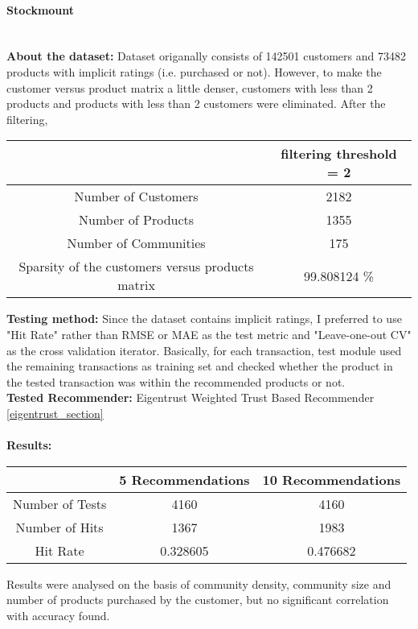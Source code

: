 	\paragraph{Stockmount} \mbox{}\\
	\textbf{About the dataset:} Dataset origanally consists of 142501 customers and 73482 products with implicit ratings (i.e. purchased or not). However, to make the customer versus product matrix a little denser, customers with less than 2 products and products with less than 2 customers were eliminated. After the filtering,
	\begin{center}
		\begin{tabular}{ | c | c |}
			\hline
			& filtering threshold = 2\\ 
			\hline
			Number of Customers & 2182\\  
			\hline
			Number of Products & 1355\\  
			\hline
			Number of Communities & 175\\  
			\hline
			Sparsity of the customers versus products matrix & 99.808124 \% \\   
			\hline
		\end{tabular}
	\end{center} 
	\vspace{0.5cm}
	\textbf{Testing method:} Since the dataset contains implicit ratings, I preferred to use "Hit Rate" rather than RMSE or MAE as the test metric and "Leave-one-out CV" as the cross validation iterator. Basically, for each transaction, test module used the remaining transactions as training set and checked whether the product in the tested transaction was within the recommended products or not.\\
	\textbf{Tested Recommender:} Eigentrust Weighted Trust Based Recommender \ref{eigentrust_section} \\ \\
	\textbf{Results:}
	\begin{center}
		\begin{tabular}{ | c | c | c |}
			\hline
			& 5 Recommendations & 10 Recommendations\\ 
			\hline
			Number of Tests&  4160 & 4160\\  
			\hline
			Number of Hits&  1367 & 1983\\  
			\hline
			Hit Rate &   0.328605 & 0.476682\\  
			\hline
		\end{tabular}
	\end{center} 
	Results were analysed on the basis of community density, community size and number of products purchased by the customer, but no significant correlation with accuracy found.
	
